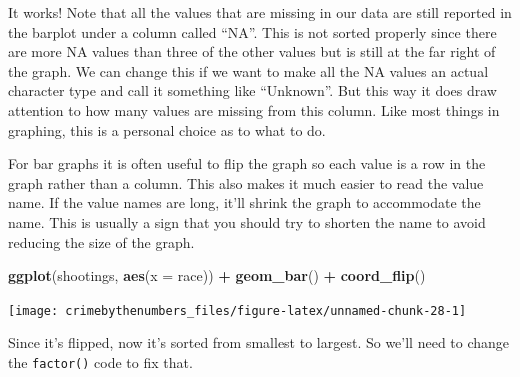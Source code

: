 \documentclass[
  12pt,
]{book}
\newenvironment{Shaded}{\begin{snugshade}}{\end{snugshade}}
\newcommand{\DataTypeTok}[1]{\textcolor[rgb]{0.27,0.27,0.27}{#1}}
\newcommand{\KeywordTok}[1]{\textcolor[rgb]{0.27,0.27,0.27}{\textbf{#1}}}
\newcommand{\NormalTok}[1]{#1}
\newcommand{\OperatorTok}[1]{\textcolor[rgb]{0.43,0.43,0.43}{\textbf{#1}}}
\newcommand{\OtherTok}[1]{\textcolor[rgb]{0.37,0.37,0.37}{#1}}
\newcommand{\StringTok}[1]{\textcolor[rgb]{0.5,0.5,0.5}{#1}}
\begin{document}
It works! Note that all the values that are missing in our data are still reported in the barplot under a column called ``NA''. This is not sorted properly since there are more NA values than three of the other values but is still at the far right of the graph. We can change this if we want to make all the NA values an actual character type and call it something like ``Unknown''. But this way it does draw attention to how many values are missing from this column. Like most things in graphing, this is a personal choice as to what to do.

For bar graphs it is often useful to flip the graph so each value is a row in the graph rather than a column. This also makes it much easier to read the value name. If the value names are long, it'll shrink the graph to accommodate the name. This is usually a sign that you should try to shorten the name to avoid reducing the size of the graph.

\begin{Shaded}
\begin{Highlighting}[]
\KeywordTok{ggplot}\NormalTok{(shootings, }\KeywordTok{aes}\NormalTok{(}\DataTypeTok{x =}\NormalTok{ race)) }\OperatorTok{+}\StringTok{ }
\StringTok{  }\KeywordTok{geom\_bar}\NormalTok{() }\OperatorTok{+}
\StringTok{  }\KeywordTok{coord\_flip}\NormalTok{() }
\end{Highlighting}
\end{Shaded}

\begin{center}\texttt{[image: crimebythenumbers\_files/figure-latex/unnamed-chunk-28-1]} \end{center}

Since it's flipped, now it's sorted from smallest to largest. So we'll need to change the \texttt{factor()} code to fix that.

\begin{Shaded}
\end{Shaded}
\end{document}
